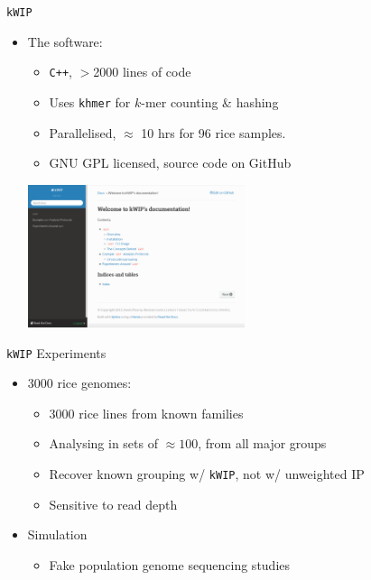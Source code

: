 \documentclass[t]{beamer}
\begin{document}
\begin{frame}{\texttt{kWIP}}
  \begin{itemize} %
    \item The software:
      \begin{itemize}
        \item \texttt{C++}, $>$2000 lines of code
        \item Uses \texttt{khmer} for $k$-mer counting \& hashing
        \item Parallelised, $\approx$ 10 hrs for 96 rice samples.
        \item GNU GPL licensed, source code on GitHub
      \end{itemize}
      \begin{center}
        \includegraphics[width=0.5\textwidth]{img/kwip-doc-screenshot.png}
      \end{center}
  \end{itemize}
\end{frame}

\begin{frame}{\texttt{kWIP} Experiments}
  \begin{itemize}
    \item 3000 rice genomes:
      \begin{itemize}
        \item 3000 rice lines from known families
        \item Analysing in sets of $\approx 100$, from all major groups
        \item Recover known grouping w/ \texttt{kWIP}, not w/ unweighted IP
        \item Sensitive to read depth
      \end{itemize}
    \item Simulation
      \begin{itemize}
        \item Fake population genome sequencing studies
      \end{itemize}
  \end{itemize}
\end{frame}
\end{document}
